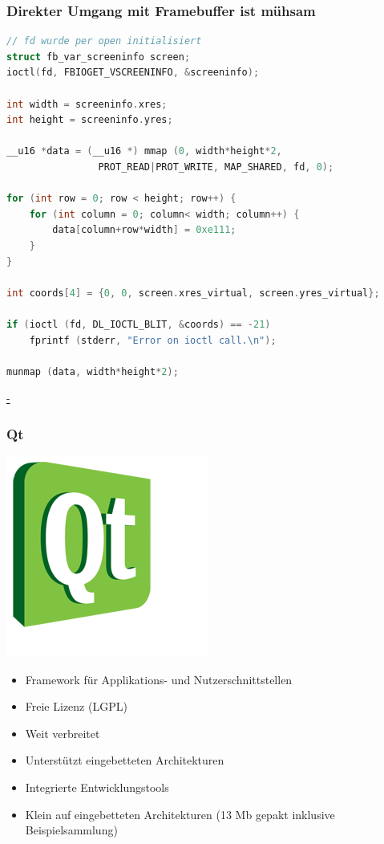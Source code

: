 \documentclass{beamer}
\begin{document}
	\begin{frame}
  \label{ioctl}
  \frametitle{Direkter Umgang mit Framebuffer ist mühsam}
		\begin{lstlisting}[language=C, basicstyle=\scriptsize]
// fd wurde per open initialisiert
struct fb_var_screeninfo screen;
ioctl(fd, FBIOGET_VSCREENINFO, &screeninfo);

int width = screeninfo.xres;
int height = screeninfo.yres;

__u16 *data = (__u16 *) mmap (0, width*height*2, 
                PROT_READ|PROT_WRITE, MAP_SHARED, fd, 0);

for (int row = 0; row < height; row++) {
    for (int column = 0; column< width; column++) {
        data[column+row*width] = 0xe111;
    }
}

int coords[4] = {0, 0, screen.xres_virtual, screen.yres_virtual};

if (ioctl (fd, DL_IOCTL_BLIT, &coords) == -21) 
    fprintf (stderr, "Error on ioctl call.\n");

munmap (data, width*height*2);
		\end{lstlisting}
    \hyperlink{backtoqt}{-}
	\end{frame}	
	
	\begin{frame}
		\frametitle{Qt}
		\begin{floatingfigure}[l]{1.75cm}
			\includegraphics[scale=0.3]{img/qt-logo}
		\end{floatingfigure}
    \begin{itemize}
      \item Framework für Applikations- und Nutzerschnittstellen
      \item Freie Lizenz (LGPL)
      \item Weit verbreitet 
      \item Unterstützt eingebetteten Architekturen
      \item Integrierte Entwicklungstools
      \item Klein auf eingebetteten Architekturen (13 Mb gepakt inklusive
        Beispielsammlung)
    \end{itemize}
	\end{frame}	
\end{document}
